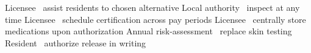 \begin{cheattablethree}
    {}
    {Licensee \may\ assist residents to chosen alternative}
    {}
    {Local authority \may\ inspect at any time}
    {}
    {Licensee \may\ schedule certification across pay periods}
    {}
    {Licensee \may\ centrally store medications upon authorization}
    {}
    {Annual risk-assessment \may\ replace skin testing}
    {}
    {Resident \may\ authorize release in writing}
    {}

\end{cheattablethree}
\clearpage
